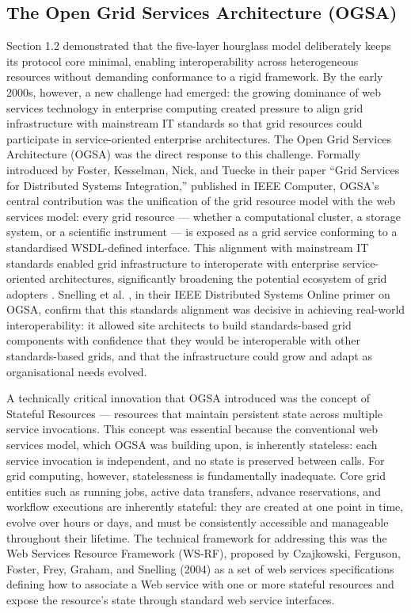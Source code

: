 \documentclass[12pt,a4paper]{report}
\begin{document}
\subsection*{The Open Grid Services Architecture (OGSA)}
Section 1.2 demonstrated that the five-layer hourglass model deliberately keeps its protocol core minimal, enabling interoperability across 
heterogeneous resources without demanding conformance to a rigid framework. By the early 2000s, however, a new challenge had emerged: the 
growing dominance of web services technology in enterprise computing created pressure to align grid infrastructure with mainstream IT
 standards so that grid resources could participate in service-oriented enterprise architectures. The Open Grid Services Architecture (OGSA)
  was the direct response to this challenge. Formally introduced by Foster, Kesselman, Nick, and Tuecke \parencite{foster2002} in their paper “Grid Services 
  for Distributed Systems Integration,” published in IEEE Computer, OGSA’s central contribution was the unification of the grid resource model 
  with the web services model: every grid resource — whether a computational cluster, a storage system, or a scientific instrument — is exposed 
  as a grid service conforming to a standardised WSDL-defined interface. This alignment with mainstream IT standards enabled grid infrastructure 
  to interoperate with enterprise service-oriented architectures, significantly broadening the potential ecosystem of grid adopters \parencite{foster2002}. 
  Snelling et al. \parencite{snelling2009}, in their IEEE Distributed Systems Online primer on OGSA, confirm that this standards alignment was decisive in achieving 
  real-world interoperability: it allowed site architects to build standards-based grid components with confidence that they would be interoperable 
  with other standards-based grids, and that the infrastructure could grow and adapt as organisational needs evolved.

A technically critical innovation that OGSA introduced was the concept of Stateful Resources — resources that maintain persistent state across 
multiple service invocations. This concept was essential because the conventional web services model, which OGSA was building upon, is inherently
 stateless: each service invocation is independent, and no state is preserved between calls. For grid computing, however, statelessness is fundamentally 
 inadequate. Core grid entities such as running jobs, active data transfers, advance reservations, and workflow executions are inherently stateful: they
  are created at one point in time, evolve over hours or days, and must be consistently accessible and manageable throughout their lifetime. The technical 
  framework for addressing this was the Web Services Resource Framework (WS-RF), proposed by Czajkowski, Ferguson, Foster, Frey, Graham, and Snelling (2004)
   as a set of web services specifications defining how to associate a Web service with one or more stateful resources and expose the resource’s state 
   through standard web service interfaces. 
   
\end{document}
